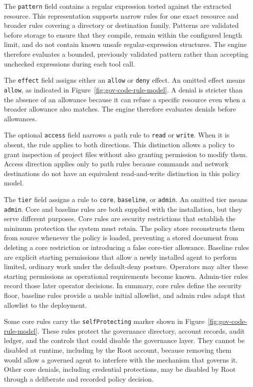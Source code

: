 The \texttt{pattern} field contains a regular expression tested against the
extracted resource. This representation supports narrow rules for one exact
resource and broader rules covering a directory or destination family.
Patterns are validated before storage to ensure that they compile, remain
within the configured length limit, and do not contain known unsafe
regular-expression structures. The engine therefore evaluates a bounded,
previously validated pattern rather than accepting unchecked expressions during
each tool call.

The \texttt{effect} field assigns either an \texttt{allow} or
\texttt{deny} effect. An omitted effect means \texttt{allow}, as indicated in
Figure~\ref{fig:gov-code-rule-model}. A denial is stricter
than the absence of an allowance because it can refuse a specific resource
even when a broader allowance also matches. The engine therefore evaluates
denials before allowances.

The optional \texttt{access} field narrows a path rule to \texttt{read} or
\texttt{write}. When it is absent, the rule applies to both directions. This
distinction allows a policy to grant inspection of project files without also
granting permission to modify them. Access direction applies only to path
rules because commands and network destinations do not have an equivalent
read-and-write distinction in this policy model.

The \texttt{tier} field assigns a rule to \texttt{core},
\texttt{baseline}, or \texttt{admin}. An omitted tier means
\texttt{admin}.
Core and baseline rules are both supplied with the installation, but they serve different purposes. Core rules are security restrictions that establish the minimum protection the system must retain. The policy store reconstructs them from source whenever the policy is loaded, preventing a stored document from deleting a core restriction or introducing a false core-tier allowance. Baseline rules are explicit starting permissions that allow a newly installed agent to perform limited, ordinary work under the default-deny posture. Operators may alter these starting permissions as operational requirements become known. Admin-tier rules record those later operator decisions. In summary, core rules define the security floor, baseline rules provide a usable initial allowlist, and admin rules adapt that allowlist to the deployment.

Some core rules carry the \texttt{selfProtecting} marker shown in
Figure~\ref{fig:gov-code-rule-model}. These rules protect the governance
directory, account records, audit ledger, and the controls that could disable
the governance layer. They cannot be disabled at runtime, including by the
Root account, because removing them would allow a governed agent to interfere
with the mechanism that governs it. Other core denials, including credential
protections, may be disabled by Root through a deliberate and recorded policy
decision.

